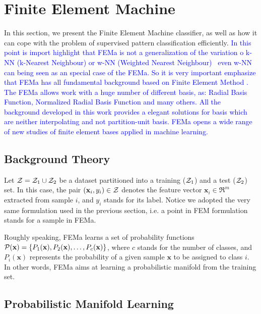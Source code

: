 \section{Finite Element Machine}
\label{s.fema}

In this section, we present the Finite Element Machine classifier, as well as how it can cope with the problem of supervised pattern classification efficiently. \textcolor{blue}{In this point is import highlight that FEMa is not a generalization of the variation o k-NN (k-Nearest Neighbour) or w-NN (Weighted Nearest Neighbour)~\cite{Samworth:12} even w-NN can being seen as an special case of the FEMa. So it is very important emphasize that FEMa has all fundamental background based on Finite Element Method . The FEMa allows work with a huge number of different basis, as: Radial Basis Function, Normalized Radial Basis Function and many others. All the background developed in this work provides a elegant solutions for basis which are neither interpolating and not partition-unit basis.  FEMa opens a wide range of new studies of finite element bases applied in machine learning.}

\subsection{Background Theory}
\label{ss.background}

Let ${\cal Z}={\cal Z}_1\cup{\cal Z}_2$ be a dataset partitioned into a training (${\cal Z}_1$) and a test (${\cal Z}_2$) set. In this case, the pair $(\textbf{x}_i,y_i)\in{\cal Z}$ denotes the feature vector $\textbf{x}_i\in\Re^m$ extracted from sample $i$, and $y_i$ stands for its label. Notice we adopted the very same formulation used in the previous section, i.e. a point in FEM formulation stands for a sample in FEMa.

Roughly speaking, FEMa learns a set of probability functions ${\cal P}(\textbf{x})=\{P_1(\textbf{x}),P_2(\textbf{x}),\ldots,P_c(\textbf{x})\}$, where $c$ stands for the number of classes, and $P_i(\textbf{x})$ represents the probability of a given sample $\textbf{x}$ to be assigned to class $i$. In other words, FEMa aims at learning a probabilistic manifold from the training set.

\subsection{Probabilistic Manifold Learning}
\label{ss.manifold}

